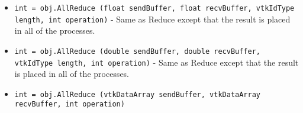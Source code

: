 \begin{itemize}
\item  \verb|int = obj.AllReduce (float sendBuffer, float recvBuffer, vtkIdType length, int operation)| -  Same as Reduce except that the result is placed in all of the processes.

\item  \verb|int = obj.AllReduce (double sendBuffer, double recvBuffer, vtkIdType length, int operation)| -  Same as Reduce except that the result is placed in all of the processes.

\item  \verb|int = obj.AllReduce (vtkDataArray sendBuffer, vtkDataArray recvBuffer, int operation)|

\end{itemize}
